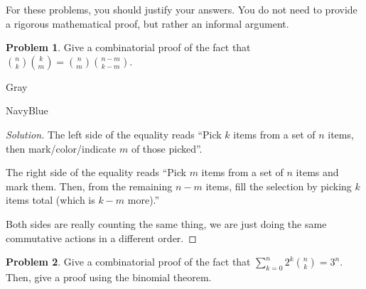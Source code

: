 \documentclass[12pt]{amsart}
\newcounter{problem_number}[section]
\theoremstyle{named}
\newenvironment{soln}
{\begin{color}{Gray}\begin{framed}\begin{color}{NavyBlue}\begin{proof}[Solution]
\doublespacing}
{\end{proof}\end{color}\end{framed}\end{color}}
\theoremstyle{definition}
\newtheorem{problem}{Problem}
\begin{document}
For these problems, you should justify your answers. You do not need to provide a rigorous mathematical proof, but rather an informal argument.

\vspace{5mm}

\begin{problem}
	Give a combinatorial proof of the fact that ${n\choose k}{k\choose m} = {n\choose m}{n-m\choose k-m}$.
\end{problem}

\begin{soln}
    \phantom{ }

	\noindent The left side of the equality reads ``Pick $k$ items from a set of $n$ items, then mark/color/indicate $m$
    of those picked''.

    \noindent The right side of the equality reads ``Pick $m$ items from a set of $n$ items and mark them. Then, from the
    remaining $n-m$ items, fill the selection by picking $k$ items total (which is $k-m$ more).''

    \noindent Both sides are really counting the same thing, we are just doing the same commutative actions in a different order. 






\end{soln}

\begin{problem}
	Give a combinatorial proof of the fact that $\displaystyle \sum_{k=0}^n2^k{n\choose k} = 3^n$.
	Then, give a proof using the binomial theorem.
\end{problem}
\end{document}

